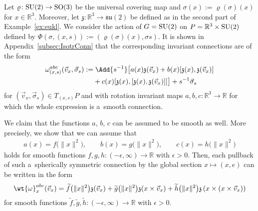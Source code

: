 \documentclass[pdftex]{sigma}
\numberwithin{equation}{section}
\begin{document}
\begin{Example}\label{bsp:Rotats}
Let $\varrho\colon {\rm SU}(2) \rightarrow {\rm SO}(3)$ be the universal covering map and $\sigma(x):=\varrho(\sigma)(x)$ for $x\in
\mathbb{R}^3$.
Moreover, let ${\mathfrak{z}}\colon \mathbb{R}^3 \rightarrow \mathfrak{su}(2)$ be def\/ined as in the second part of
Example~\ref{ex:eukl}.
We consider the action of $G={\rm SU}(2)$ on $P=\mathbb{R}^3\times {\rm SU}(2)$ def\/ined by $\Phi(\sigma,
(x,s)):=(\varrho(\sigma)(x),\sigma s)$.
It is shown in Appendix~\ref{subsec:IsotrConn} that the corresponding invariant connections are of the form
\begin{gather}
\begin{split}
& \omega^{abc}_{(x,s)}(\vec{v}_x,\vec{\sigma}_s):= \Add{s^{-1}}\big[a(x){\mathfrak{z}}(\vec{v}_x)+ b(x)[{\mathfrak{z}}(x),{\mathfrak{z}}(\vec{v}_x)]
\\
& \hphantom{\omega^{abc}_{(x,s)}(\vec{v}_x,\vec{\sigma}_s):=}{}
{}+c(x)[{\mathfrak{z}}(x),[{\mathfrak{z}}(x),{\mathfrak{z}}(\vec{v}_x)]]\big]+ s^{-1}\vec{\sigma}_s
\end{split} \label{eq:rotinvconn}
\end{gather}
for $(\vec{v}_x,\vec{\sigma}_s)\in T_{(x,s)}P$ and with rotation invariant maps $a,b,c\colon \mathbb{R}^3\rightarrow
\mathbb{R}$ for which the whole expression is a~smooth connection.

We claim that the functions $a$, $b$, $c$ can be assumed to be smooth as well.
More precisely, we show that we can assume that
\begin{gather*}
a(x)=f\big(\|x\|^2\big),
\qquad
b(x)=g\big(\|x\|^2\big),
\qquad
c(x)=h\big(\|x\|^2\big)
\end{gather*}
holds for smooth functions $f,g,h\colon (-\epsilon,\infty)\rightarrow \mathbb{R}$ with $\epsilon>0$.
Then, each pullback of such a~spherically symmetric connection by the global section $x\mapsto (x,e)$ can be written in
the form
\begin{gather*}
\wt{\omega}^{abc}_x(\vec{v}_x)=\widetilde{f}\big(\|x\|^2\big){\mathfrak{z}}(\vec{v}_x)+\widetilde{g}\big(\|x\|^2\big){\mathfrak{z}}(x\times \vec{v}_x)
+\widetilde{h}\big(\|x\|^2\big){\mathfrak{z}}\left(x\times (x\times \vec{v}_x)\right)
\end{gather*}
for smooth functions $\widetilde{f},\widetilde{g},\widetilde{h}\colon (-\epsilon,\infty)\rightarrow \mathbb{R}$ with $\epsilon>0$.



\end{Example}
\end{document}
